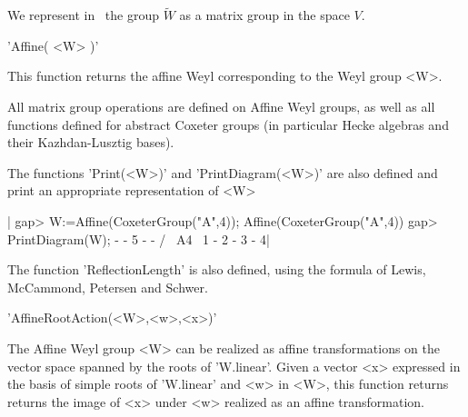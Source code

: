 We  represent in \GAP\ the group $\tilde W$  as a matrix group in the space
$V$.

%

'Affine( <W> )'

This function returns the affine Weyl corresponding to the Weyl group <W>.


All  matrix group operations are defined on  Affine Weyl groups, as well as
all  functions  defined  for  abstract  Coxeter groups (in particular Hecke
algebras and their Kazhdan-Lusztig bases).

The  functions 'Print(<W>)'  and 'PrintDiagram(<W>)'  are also  defined and
print an appropriate representation of <W>\:

|    gap> W:=Affine(CoxeterGroup("A",4));
    Affine(CoxeterGroup("A",4))
    gap> PrintDiagram(W);
            - - 5 - -
           /         \
    A4~   1 - 2 - 3 - 4|

The  function  'ReflectionLength'  is  also  defined,  using the formula of
Lewis, McCammond, Petersen and Schwer.

\Section{AffineRootAction}

'AffineRootAction(<W>,<w>,<x>)'

The  Affine Weyl group <W> can be realized as affine transformations on the
vector  space  spanned  by  the  roots  of  'W.linear'.  Given a vector <x>
expressed  in the basis of simple roots  of 'W.linear' and <w> in <W>, this
function  returns returns the image of <x>  under <w> realized as an affine
transformation.

